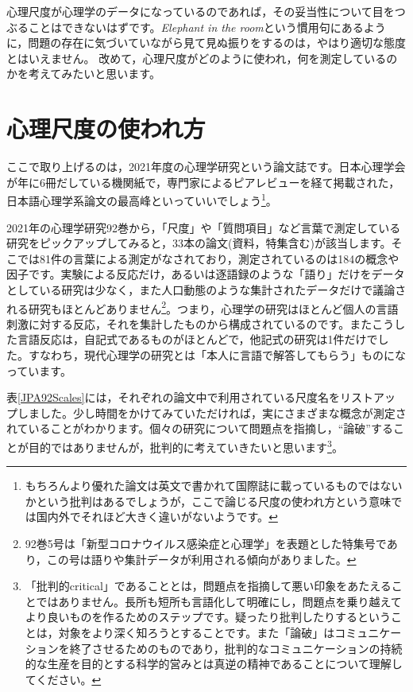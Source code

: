\documentclass{ltjsbook}
\begin{document}
心理尺度が心理学のデータになっているのであれば，その妥当性について目をつぶることはできないはずです。\textit{Elephant in the room}という慣用句にあるように，問題の存在に気づいていながら見て見ぬ振りをするのは，やはり適切な態度とはいえません。
改めて，心理尺度がどのように使われ，何を測定しているのかを考えてみたいと思います。

\section{心理尺度の使われ方}
ここで取り上げるのは，2021年度の心理学研究という論文誌です。日本心理学会が年に6冊だしている機関紙で，専門家によるピアレビューを経て掲載された，日本語心理学系論文の最高峰といっていいでしょう\footnote{もちろんより優れた論文は英文で書かれて国際誌に載っているものではないかという批判はあるでしょうが，ここで論じる尺度の使われ方という意味では国内外でそれほど大きく違いがないようです。}。

2021年の心理学研究92巻から，「尺度」や「質問項目」など言葉で測定している研究をピックアップしてみると，33本の論文(資料，特集含む)が該当します。そこでは81件の言葉による測定がなされており，測定されているのは184の概念や因子です。実験による反応だけ，あるいは逐語録のような「語り」だけをデータとしている研究は少なく，また人口動態のような集計されたデータだけで議論される研究もほとんどありません\footnote{92巻5号は「新型コロナウイルス感染症と心理学」を表題とした特集号であり，この号は語りや集計データが利用される傾向がありました。}。つまり，心理学の研究はほとんど個人の言語刺激に対する反応，それを集計したものから構成されているのです。またこうした言語反応は，自記式であるものがほとんどで，他記式の研究は1件\textcite{Nagatani202292}だけでした。すなわち，現代心理学の研究とは「本人に言語で解答してもらう」ものになっています。

表\ref{JPA92Scales}には，それぞれの論文中で利用されている尺度名をリストアップしました。少し時間をかけてみていただければ，実にさまざまな概念が測定されていることがわかります。個々の研究について問題点を指摘し，``論破''することが目的ではありませんが，批判的に考えていきたいと思います\footnote{「批判的critical」であることとは，問題点を指摘して悪い印象をあたえることではありません。長所も短所も言語化して明確にし，問題点を乗り越えてより良いものを作るためのステップです。疑ったり批判したりするということは，対象をより深く知ろうとすることです。また「論破」はコミュニケーションを終了させるためのものであり，批判的なコミュニケーションの持続的な生産を目的とする科学的営みとは真逆の精神であることについて理解してください。}。
\end{document}
